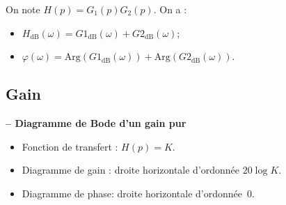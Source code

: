 \begin{prop}
On note $H(p)=G_1(p)G_2(p)$. On a :
\begin{itemize}
\item $H_{\text{dB}}\left( \omega\right) =G1_{\text{dB}}\left( \omega\right)+G2_{\text{dB}}\left( \omega\right)$;
\item $\varphi\left( \omega\right)  =\text{Arg}\left(G1_{\text{dB}}\left( \omega\right)\right)+\text{Arg}\left(G2_{\text{dB}}\left( \omega\right)\right)$.
\end{itemize}
\end{prop}
\vspace{-.8cm}

\subsection{Gain}

\begin{marginfigure}
\centering
{}

\end{marginfigure}
\begin{resultat}\textbf{\textsf{\small -- Diagramme de Bode d'un gain pur}} 
\begin{itemize}
\item Fonction de transfert : $H(p)=K$.
\item Diagramme de gain : droite horizontale d'ordonnée $20 \log K$.
\item Diagramme de phase: droite horizontale d'ordonnée~0\degre.
\end{itemize}
\end{resultat}

